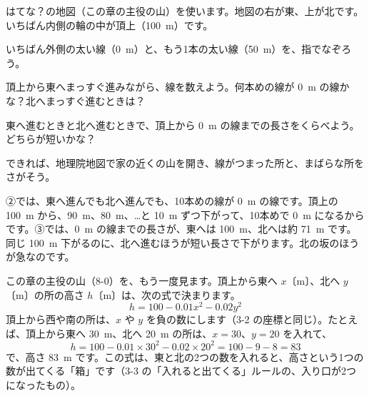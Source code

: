 \begin{yattemiyou}[等高線の地図を読もう]
はてな？の地図（この章の主役の山）を使います。地図の右が東、上が北です。いちばん内側の輪の中が頂上（\qty{100}{m}）です。
\begin{enumerate}[label={\bkcircled[bkGreen]{\arabic*}}, leftmargin=2.4\zw, itemsep=1pt, topsep=3pt]
\item いちばん外側の太い線（\qty{0}{m}）と、もう1本の太い線（\qty{50}{m}）を、指でなぞろう。
\item 頂上から東へまっすぐ進みながら、線を数えよう。何本めの線が \qty{0}{m} の線かな？\enspace 北へまっすぐ進むときは？
\item 東へ進むときと北へ進むときで、頂上から \qty{0}{m} の線までの長さをくらべよう。どちらが短いかな？
\item できれば、地理院地図で家の近くの山を開き、線がつまった所と、まばらな所をさがそう。
\end{enumerate}
\end{yattemiyou}

\noindent ②では、東へ進んでも北へ進んでも、10本めの線が \qty{0}{m} の線です。頂上の \qty{100}{m} から、\qty{90}{m}、\qty{80}{m}、…と \qty{10}{m} ずつ下がって、10本めで \qty{0}{m} になるからです。③では、\qty{0}{m} の線までの長さが、東へは \qty{100}{m}、北へは約 \qty{71}{m} です。同じ \qty{100}{m} 下がるのに、北へ進むほうが短い長さで下がります。北の坂のほうが急なのです。

\begin{omoidasou}
\end{omoidasou}




\label{bk:8-1:basho}この章の主役の山（8-0）を、もう一度見ます。頂上から東へ $x$〔m〕、北へ $y$〔m〕の所の高さ $h$〔m〕は、次の式で決まります。
\[ h=100-0.01x^2-0.02y^2 \]
頂上から西や南の所は、$x$ や $y$ を負の数にします（3-2 の座標と同じ）。たとえば、頂上から東へ \qty{30}{m}、北へ \qty{20}{m} の所は、$x=30$、$y=20$ を入れて、
\[ h=100-0.01\times30^2-0.02\times20^2=100-9-8=83 \]
で、高さ \qty{83}{m} です。この式は、東と北の2つの数を入れると、高さという1つの数が出てくる「箱」です（3-3 の「入れると出てくる」ルールの、入り口が2つになったもの）。

